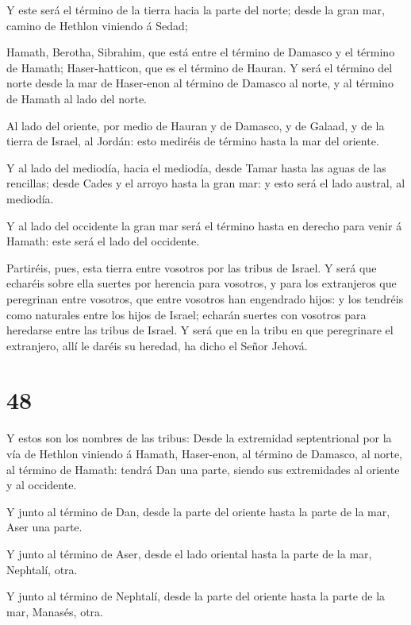  Y este será el término de la tierra hacia la parte del
norte; desde la gran mar, camino de Hethlon viniendo á Sedad;

 Hamath, Berotha, Sibrahim, que está entre el término de
Damasco y el término de Hamath; Haser-hatticon, que es el término de
Hauran.  Y será el término del norte desde la mar de
Haser-enon al término de Damasco al norte, y al término de Hamath al
lado del norte.

 Al lado del oriente, por medio de Hauran y de Damasco, y
de Galaad, y de la tierra de Israel, al Jordán: esto mediréis de término
hasta la mar del oriente.

 Y al lado del mediodía, hacia el mediodía, desde Tamar
hasta las aguas de las rencillas; desde Cades y el arroyo hasta la gran
mar: y esto será el lado austral, al mediodía.

 Y al lado del occidente la gran mar será el término hasta
en derecho para venir á Hamath: este será el lado del occidente.

 Partiréis, pues, esta tierra entre vosotros por las tribus
de Israel.  Y será que echaréis sobre ella suertes por
herencia para vosotros, y para los extranjeros que peregrinan entre
vosotros, que entre vosotros han engendrado hijos: y los tendréis como
naturales entre los hijos de Israel; echarán suertes con vosotros para
heredarse entre las tribus de Israel.  Y será que en la
tribu en que peregrinare el extranjero, allí le daréis su heredad, ha
dicho el Señor Jehová.

\hypertarget{section-47}{%
\section{48}\label{section-47}}

 Y estos son los nombres de las tribus: Desde la extremidad
septentrional por la vía de Hethlon viniendo á Hamath, Haser-enon, al
término de Damasco, al norte, al término de Hamath: tendrá Dan una
parte, siendo sus extremidades al oriente y al occidente.

 Y junto al término de Dan, desde la parte del oriente hasta
la parte de la mar, Aser una parte.

 Y junto al término de Aser, desde el lado oriental hasta la
parte de la mar, Nephtalí, otra.

 Y junto al término de Nephtalí, desde la parte del oriente
hasta la parte de la mar, Manasés, otra.

